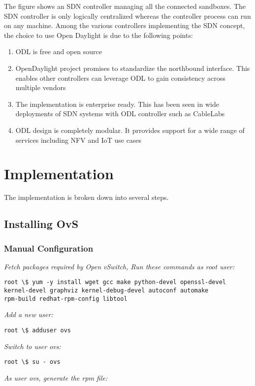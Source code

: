 \documentclass[12pt]{extarticle}
\begin{document}
The figure shows an SDN controller managing all the connected sandboxes. The SDN controller is only logically centralized whereas the controller process can run on any machine. Among the various controllers implementing the SDN concept, the choice to use Open Daylight is due to the following points:
\begin{enumerate}
    \item ODL is free and open source
    \item OpenDaylight project promises to standardize the northbound interface. This enables other controllers can leverage ODL to gain consistency across multiple vendors
    \item The implementation is enterprise ready. This has been seen in wide deployments of SDN systems with ODL controller such as CableLabs
    \item ODL design is completely modular. It prrovides support for a wide range of services including NFV and IoT use cases
\end{enumerate}

\section{Implementation}

The implementation is broken down into several steps. 
\subsection{Installing OvS}

\subsubsection{Manual Configuration} \label{man_ovs_install}
\textit{Fetch packages required by Open vSwitch, Run these commands as root user:}
\begin{verbatim}
root \$ yum -y install wget gcc make python-devel openssl-devel
kernel-devel graphviz kernel-debug-devel autoconf automake 
rpm-build redhat-rpm-config libtool
\end{verbatim}
\noindent
\textit{Add a new user: }

\begin{verbatim}
root \$ adduser ovs
\end{verbatim}
\noindent
\textit{Switch to user ovs:}

\begin{verbatim}
root \$ su - ovs
\end{verbatim}
\noindent
\textit{As user ovs, generate the rpm file:}
\end{document}
